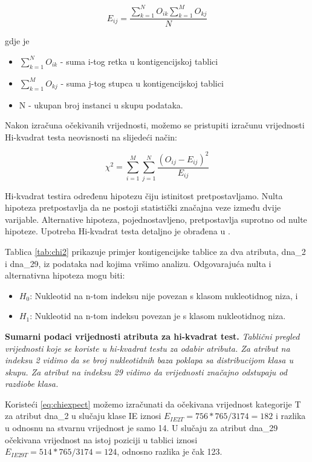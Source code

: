 \begin{equation}\label{eq:chiexpect}
E_{ij} = \frac{\sum_{k=1}^{N}O_{ik}\sum_{k=1}^{M}O_{kj}}{N}
\end{equation}

gdje je 

\begin{itemize}
    \item $\sum_{k=1}^{N}O_{ik}$ - suma i-tog retka u kontigencijskoj tablici
    \item $\sum_{k=1}^{M}O_{kj}$ - suma j-tog stupca u kontigencijskoj tablici
    \item N - ukupan broj instanci u skupu podataka.
\end{itemize}

Nakon izračuna očekivanih vrijednosti, možemo se pristupiti izračunu vrijednosti Hi-kvadrat testa neovisnosti na slijedeći način:

\begin{equation}
    \chi^2 = \sum_{i=1}^{M}\sum_{j=1}^{N}\frac{(O_{ij}-E_{ij})^2}{E_{ij}}
\end{equation}

Hi-kvadrat testira određenu hipotezu čiju istinitost pretpostavljamo. Nulta hipoteza pretpostavlja da ne postoji statistički značajna veze između dvije varijable. Alternative hipoteza, pojednostavljeno, pretpostavlja suprotno od nulte hipoteze. Upotreba Hi-kvadrat testa detaljno je obrađena u \cite{Grubi01}.

Tablica \ref{tab:chi2} prikazuje primjer kontigencijske tablice za dva atributa, dna{\_2} i dna{\_}29, iz podataka nad kojima vršimo analizu. Odgovarajuća nulta i alternativna hipoteza mogu biti:
\begin{itemize}
    \item $H_0$: Nukleotid na n-tom indeksu nije povezan s klasom nukleotidnog niza, i 
    \item $H_1$: Nukleotid na n-tom indeksu povezan je s klasom nukleotidnog niza.
\end{itemize}

\begin{table}
\centering
    \caption[Sumarni podaci vrijednosti atributa za hi-kvadrat test]{\textbf{Sumarni podaci vrijednosti atributa za hi-kvadrat test.} \textit{Tablični pregled vrijednosti koje se koriste u hi-kvadrat testu za odabir atributa. Za atribut na indeksu 2 vidimo da se broj nukleotidnih baza poklapa sa distribucijom klasa u skupu. Za atribut na indeksu 29 vidimo da vrijednosti značajno odstupaju od razdiobe klasa.}}
    \label{tab:chi2}
\end{table}
Koristeći \eqref{eq:chiexpect} možemo izračunati da očekivana vrijednost kategorije T za atribut dna{\_}2 u slučaju klase IE iznosi $E_{IE2T} = 756*765/3174 = 182$ i razlika u odnosnu na stvarnu vrijednost je samo 14. U slučaju za atribut dna{\_}29 očekivana vrijednost na istoj poziciji u tablici iznosi $E_{IE29T} = 514*765/3174 = 124$, odnosno razlika je čak 123.

